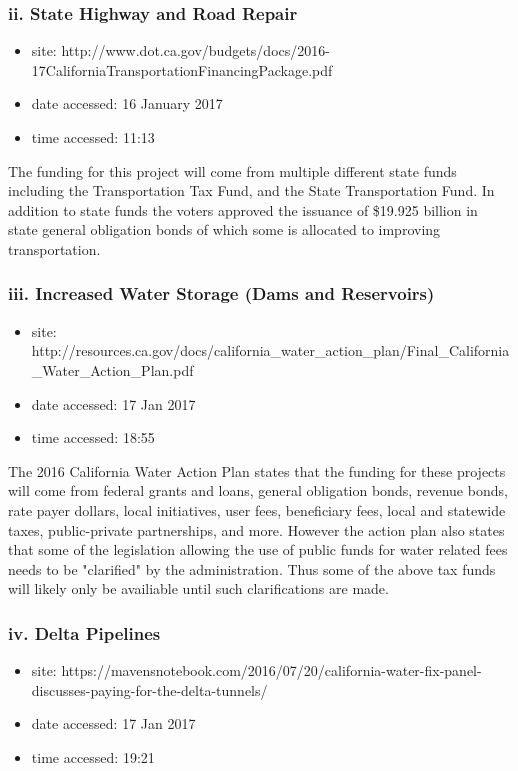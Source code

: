 \documentclass[12pt]{article} %
\begin{document}
		\subsubsection{ii. State Highway and Road Repair}
			\begin{itemize}
				\item site: {\small http://www.dot.ca.gov/budgets/docs/2016-17CaliforniaTransportationFinancingPackage.pdf}
				\item date accessed: 16 January 2017
				\item time accessed: 11:13
			\end{itemize}
	
			The funding for this project will come from multiple different state funds including the Transportation Tax Fund, and the State Transportation Fund. In addition to state funds the voters approved the issuance of \$19.925 billion in state general obligation bonds of which some is allocated to improving transportation.
		
		\subsubsection{iii. Increased Water Storage (Dams and Reservoirs)}
			\begin{itemize}
				\item site: {\small http://resources.ca.gov/docs/california\_water\_action\_plan/Final\_California\_Water\_Action\_Plan.pdf}
				\item date accessed: 17 Jan 2017
				\item time accessed: 18:55
			\end{itemize}
			
			The 2016 California Water Action Plan states that the funding for these projects will come from federal grants and loans, general obligation bonds, revenue bonds, rate payer dollars, local initiatives, user fees, beneficiary fees, local and statewide taxes, public-private partnerships, and more. However the action plan also states that some of the legislation allowing the use of public funds for water related fees needs to be "clarified" by the administration. Thus some of the above tax funds will likely only be availiable until such clarifications are made.
			
		\subsubsection{iv. Delta Pipelines}
			\begin{itemize}
				\item site: {\small https://mavensnotebook.com/2016/07/20/california-water-fix-panel-discusses-paying-for-the-delta-tunnels/}
				\item date accessed: 17 Jan 2017
				\item time accessed: 19:21
			\end{itemize}
\end{document}
